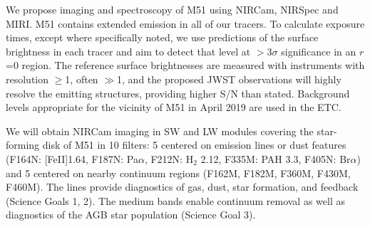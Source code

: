 \documentclass[12pt]{article}
\begin{document}


\newpage

%
%
\justifyobservations   %
\vspace{-0.5\baselineskip}

\vspace{-0.1in}
We propose imaging and spectroscopy of M51 using NIRCam, NIRSpec and MIRI. M51 contains extended emission in all of our tracers. To calculate exposure times, except where specifically noted, we use predictions of the surface brightness in each tracer and aim to detect that level at $>$3$\sigma$ significance in an $r$=0 region. The reference surface brightnesses are measured with instruments with resolution $\geq$1\arcsec, often $\gg$1\arcsec, and the proposed JWST observations will highly resolve the emitting structures, providing higher S/N than stated. Background levels appropriate for the vicinity of M51 in April 2019 are used in the ETC. 

\vspace{0.05in}

 We will obtain NIRCam imaging in SW and LW modules covering the star-forming disk of M51 in 10 filters: 5 centered on emission lines or dust features (F164N: [Fe{\small II}]1.64\micron, F187N: Pa$\alpha$, F212N: H$_2$ 2.12\micron, F335M: PAH 3.3\micron, F405N: Br$\alpha$) and 5 centered on nearby continuum regions (F162M, F182M, F360M, F430M, F460M). The lines provide diagnostics of gas, dust, star formation, and feedback (Science Goals 1, 2).  The medium bands enable continuum removal as well as diagnostics of the AGB star population (Science Goal 3).  
\end{document}
